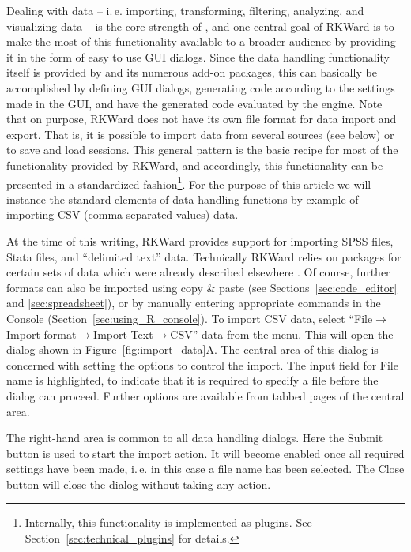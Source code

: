 Dealing with data -- i.\,e. importing, transforming, filtering, analyzing, and visualizing data --
is the core strength of , and one central goal of
RKWard is to make the most of this functionality available to a broader
audience by providing it in the form of easy to use GUI dialogs. Since
the data handling functionality itself is provided by
 and its numerous add-on packages, this
can basically be accomplished by defining GUI dialogs, generating
 code according to the settings made in
the GUI, and have the generated code evaluated by the
 engine. Note that on purpose, RKWard does not have its
own file format for data import and export. That is, it is possible
to import data from several sources (see below) or to save and load
 sessions. This general pattern is the %
basic recipe for most of the functionality provided by RKWard, and
accordingly, this functionality can be presented in a standardized
fashion\footnote{Internally, this functionality is implemented as
plugins. See Section~\ref{sec:technical_plugins} for details.}. For
the purpose of this article we will instance the standard
elements of data handling functions by example of importing CSV
(comma-separated values) data.

At the time of this writing, RKWard provides support for importing SPSS
files, Stata files, and ``delimited text'' data. Technically RKWard
relies on  packages for certain sets of
data which were already described elsewhere
\citep{Murdoch2002}. Of course, further formats can
also be imported using copy \& paste (see Sections~\ref{sec:code_editor} and \ref{sec:spreadsheet}), or by
manually entering appropriate  commands in
the  Console (Section~\ref{sec:using_R_console}). To import CSV
data, select ``File$\rightarrow$Import format$\rightarrow$Import Text$\rightarrow$CSV''
data from the menu. This will open the dialog shown in
Figure~\ref{fig:import_data}A. The central area of this dialog is concerned with setting
the options to control the import. The input field for
File name is highlighted, to indicate that
it is required to specify a file before the dialog can proceed.
Further options are available from tabbed pages of the central area.

The right-hand area is common to all data handling
dialogs. Here the Submit button is used
to start the import action. It will become enabled once all required
settings have been made, i.\,e. in this case a file name has been
selected. The Close button will close the
dialog without taking any action.

